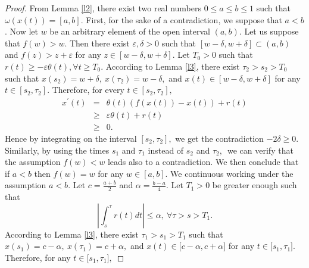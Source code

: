 \documentclass[10pt,a4paper]{amsart}
\begin{document}
\begin{proof}
From Lemma \ref{l2}, there exist two real numbers $0\leq a\leq b\leq 1$ such that $\omega
(x(t))=[a,b].$ First, for the sake of a contradiction, we suppose that $a<b$.  Now let $w$ be an arbitrary element of the open interval $(a,b).$ Let us
suppose that $f(w)>w.$ Then there exist $\varepsilon ,\delta >0$ such that $%
[w-\delta ,w+\delta ]\subset (a,b)$ and $f(z)>z+\varepsilon $ for any $z\in [w-\delta ,w+\delta ].$ Let $T_{0}>0$ such that $r(t)\geq
-\varepsilon \theta (t),\forall t\geq T_{0}.$ According to Lemma \ref{l3}, there
exist $\tau _{2}>s_{2}>T_{0}$ such that $x(s_{2})=w+\delta ,~x(\tau
_{2})=w-\delta ,$ and $x(t)\in [w-\delta ,w+\delta ]$ for any $t\in
[s_{2},\tau _{2}].$ Therefore, for every $t\in [s_{2},\tau
_{2}],$%
\begin{eqnarray*}
x^{\prime }(t) &=&\theta (t)(f(x(t))-x(t))+r(t) \\
&\geq &\varepsilon \theta (t)+r(t) \\
&\geq &0.
\end{eqnarray*}%
Hence by integrating on the interval $[s_{2},\tau _{2}],$ we get the
contradiction $-2\delta \geq 0.$ Similarly, by using the times $s_{1}$ and $%
\tau _{1}$ instead of $s_{2}$ and $\tau _{2},$\ we can verify that the
assumption $f(w)<w$ leads also to a contradiction. We then conclude that if $%
a<b$ then $f(w)=w$ for any $w\in [a,b].$ We continuous working under
the assumption $a<b.$ Let $c=\frac{a+b}{2}$ and $\alpha =\frac{b-a}{4}.$ Let
$T_{1}>0$ be greater enough such that
\begin{equation}
\left\vert \int_{s}^{\tau }r(t)dt\right\vert \leq \alpha ,~\forall \tau
>s>T_{1}.  \label{h5}
\end{equation}%
According to Lemma \ref{l3}, there exist $\tau _{1}>s_{1}>T_{1}$ such that $%
x(s_{1})=c-\alpha ,~x(\tau _{1})=c+\alpha ,$ and $x(t)\in \lbrack c-\alpha
,c+\alpha ]$ for any $t\in \lbrack s_{1},\tau _{1}].$ Therefore, for any $%
t\in \lbrack s_{1},\tau _{1}],$


\end{proof}
\end{document}
